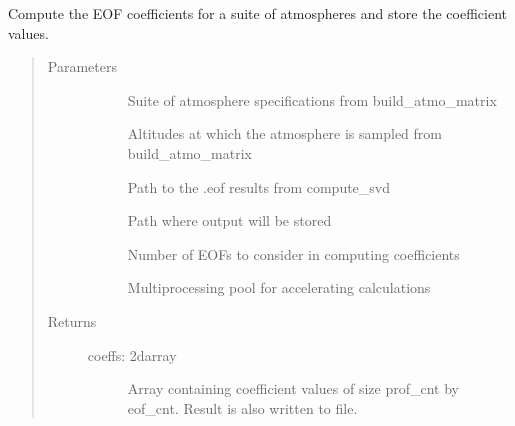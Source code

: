 \documentclass[letterpaper,10pt,english]{sphinxmanual}
\begin{document}
\begin{fulllineitems}
\label{\detokenize{stochprop.eofs:stochprop.eofs.compute_coeffs}}
Compute the EOF coefficients for a suite of atmospheres
and store the coefficient values.
\begin{quote}\begin{description}
\item[{Parameters}] \leavevmode\begin{description}
\item[{}] \leavevmode
Suite of atmosphere specifications from build\_atmo\_matrix

\item[{}] \leavevmode
Altitudes at which the atmosphere is sampled from build\_atmo\_matrix

\item[{}] \leavevmode
Path to the .eof results from compute\_svd

\item[{}] \leavevmode
Path where output will be stored

\item[{}] \leavevmode
Number of EOFs to consider in computing coefficients

\item[{}] \leavevmode
Multiprocessing pool for accelerating calculations

\end{description}

\item[{Returns}] \leavevmode\begin{description}
\item[{coeffs: 2darray}] \leavevmode
Array containing coefficient values of size prof\_cnt by eof\_cnt.  Result is also written to file.

\end{description}

\end{description}\end{quote}

\end{fulllineitems}
\end{document}

